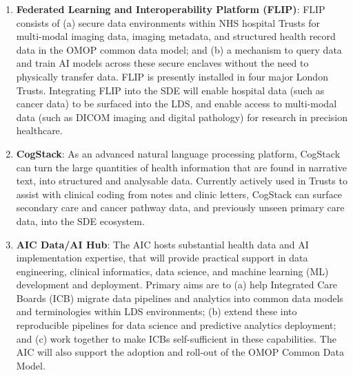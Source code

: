 \documentclass[
  letterpaper,
  DIV=11,
  numbers=noendperiod]{scrartcl}
\begin{document}
\begin{enumerate}
\def\labelenumi{(\arabic{enumi})}
\item
  \textbf{Federated Learning and Interoperability Platform (FLIP)}: FLIP
  consists of (a) secure data environments within NHS hospital Trusts
  for multi-modal imaging data, imaging metadata, and structured health
  record data in the OMOP common data model; and (b) a mechanism to
  query data and train AI models across these secure enclaves without
  the need to physically transfer data. FLIP is presently installed in
  four major London Trusts. Integrating FLIP into the SDE will enable
  hospital data (such as cancer data) to be surfaced into the LDS, and
  enable access to multi-modal data (such as DICOM imaging and digital
  pathology) for research in precision healthcare.
\item
  \textbf{CogStack}: As an advanced natural language processing
  platform, CogStack can turn the large quantities of health information
  that are found in narrative text, into structured and analysable data.
  Currently actively used in Trusts to assist with clinical coding from
  notes and clinic letters, CogStack can surface secondary care and
  cancer pathway data, and previously unseen primary care data, into the
  SDE ecosystem.
\item
  \textbf{AIC Data/AI Hub}: The AIC hosts substantial health data and AI
  implementation expertise, that will provide practical support in data
  engineering, clinical informatics, data science, and machine learning
  (ML) development and deployment. Primary aims are to (a) help
  Integrated Care Boards (ICB) migrate data pipelines and analytics into
  common data models and terminologies within LDS environments; (b)
  extend these into reproducible pipelines for data science and
  predictive analytics deployment; and (c) work together to make ICBs
  self-sufficient in these capabilities. The AIC will also support the
  adoption and roll-out of the OMOP Common Data Model.
\end{enumerate}
\end{document}
